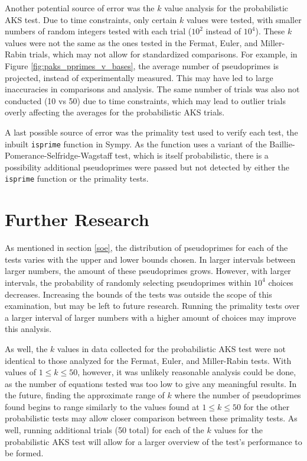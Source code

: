 \documentclass{article}
\begin{document}
Another potential source of error was the $k$ value analysis for the probabilistic AKS test. Due to time constraints, only certain $k$ values were tested, with smaller numbers of random integers tested with each trial ($10^2$ instead of $10^4$). These $k$ values were not the same as the ones tested in the Fermat, Euler, and Miller-Rabin trials, which may not allow for standardized comparisons. For example, in Figure \ref{fig:paks_pprimes_v_bases}, the average number of pseudoprimes is projected, instead of experimentally measured. This may have led to large inaccuracies in comparisons and analysis. The same number of trials was also not conducted (10 vs 50) due to time constraints, which may lead to outlier trials overly affecting the averages for the probabilistic AKS trials.

A last possible source of error was the primality test used to verify each test, the inbuilt \texttt{isprime} function in Sympy. As the function uses a variant of the Baillie-Pomerance-Selfridge-Wagstaff test, which is itself probabilistic, there is a possibility additional pseudoprimes were passed but not detected by either the \texttt{isprime} function or the primality tests.

\section{Further Research}
As mentioned in section \ref{soe}, the distribution of pseudoprimes for each of the tests varies with the upper and lower bounds chosen. In larger intervals between larger numbers, the amount of these pseudoprimes grows. However, with larger intervals, the probability of randomly selecting pseudoprimes within $10^4$ choices decreases. Increasing the bounds of the tests was outside the scope of this examination, but may be left to future research. Running the primality tests over a larger interval of larger numbers with a higher amount of choices may improve this analysis. 

As well, the $k$ values in data collected for the probabilistic AKS test were not identical to those analyzed for the Fermat, Euler, and Miller-Rabin tests. With values of $1 \leq k \leq 50$, however, it was unlikely reasonable analysis could be done, as the number of equations tested was too low to give any meaningful results. In the future, finding the approximate range of $k$ where the number of pseudoprimes found begins to range similarly to the values found at $1 \leq k \leq 50$ for the other probabilistic tests may allow closer comparison between these primality tests. As well, running additional trials (50 total) for each of the $k$ values for the probabilistic AKS test will allow for a larger overview of the test's performance to be formed.
\end{document}
